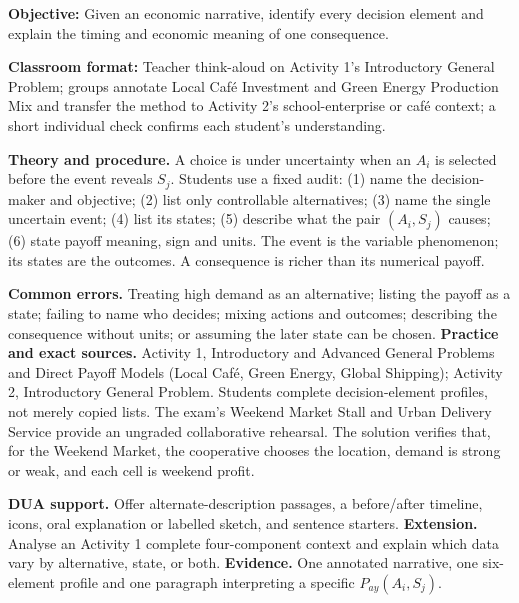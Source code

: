 \documentclass[10pt,letterpaper]{article}
\newcommand{\labelled}[2]{\textbf{#1:} #2\par}
\newcommand{\partheading}[1]{\Needspace{6\baselineskip}\par\vspace{5pt}{\bfseries #1\par}\vspace{1pt}}
\begin{document}
	\vspace{5pt}
	\begin{bluebox}
		\fontsize{8.35}{10.55}\selectfont
		\partheading{Part 1---C1: Interpret the Anatomy of a Decision}
		\labelled{Objective}{Given an economic narrative, identify every decision element and explain the timing and economic meaning of one consequence.}
		\labelled{Classroom format}{Teacher think-aloud on Activity 1's Introductory General Problem; groups annotate Local Caf\'e Investment and Green Energy Production Mix and transfer the method to Activity 2's school-enterprise or caf\'e context; a short individual check confirms each student's understanding.}
		\textbf{Theory and procedure.} A choice is under uncertainty when an $A_i$ is
		selected before the event reveals $S_j$. Students use a fixed audit: (1) name
		the decision-maker and objective; (2) list only controllable alternatives;
		(3) name the single uncertain event; (4) list its states; (5) describe what the
		pair $(A_i,S_j)$ causes; (6) state payoff meaning, sign and units. The event is
		the variable phenomenon; its states are the outcomes. A consequence is richer
		than its numerical payoff.
		
		\textbf{Common errors.} Treating high demand as an alternative; listing the
		payoff as a state; failing to name who decides; mixing actions and outcomes;
		describing the consequence without units; or assuming the later state can be
		chosen. \textbf{Practice and exact sources.} Activity 1, Introductory and
		Advanced General Problems and Direct Payoff Models (Local Caf\'e, Green Energy,
		Global Shipping); Activity 2, Introductory General Problem. Students complete
		decision-element profiles, not merely copied lists. The exam's Weekend Market
		Stall and Urban Delivery Service provide an ungraded collaborative rehearsal.
		The solution verifies that, for the Weekend Market, the cooperative chooses
		the location, demand is strong or weak, and each cell is weekend profit.
		
		\textbf{DUA support.} Offer alternate-description passages, a before/after
		timeline, icons, oral explanation or labelled sketch, and sentence starters.
		\textbf{Extension.} Analyse an Activity 1 complete four-component context and
		explain which data vary by alternative, state, or both. \textbf{Evidence.} One
		annotated narrative, one six-element profile and one paragraph interpreting a
		specific $P_{ay}(A_i,S_j)$.
		

\end{bluebox}
\end{document}
